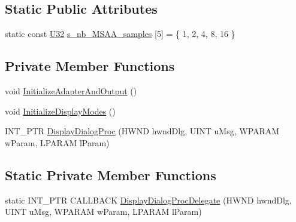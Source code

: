 \subsection*{Static Public Attributes}
\begin{DoxyCompactItemize}
\item 
static const \hyperlink{namespacemage_a41c104c036fba3756a74e19f793eeaa1}{U32} \hyperlink{classmage_1_1_display_configurator_ae4030ce3b63836e4e5c374285cf1f3bc}{s\+\_\+nb\+\_\+\+M\+S\+A\+A\+\_\+samples} \mbox{[}5\mbox{]} = \{ 1, 2, 4, 8, 16 \}
\end{DoxyCompactItemize}
\subsection*{Private Member Functions}
\begin{DoxyCompactItemize}
\item 
void \hyperlink{classmage_1_1_display_configurator_a03fd2c38f6fdb6fbc8ff429a7d0d2a89}{Initialize\+Adapter\+And\+Output} ()
\item 
void \hyperlink{classmage_1_1_display_configurator_a90ecffb8d93768464bb1698531a34db7}{Initialize\+Display\+Modes} ()
\item 
I\+N\+T\+\_\+\+P\+TR \hyperlink{classmage_1_1_display_configurator_a6b43b4d9a5e5beeee435bf93fc9865ef}{Display\+Dialog\+Proc} (H\+W\+ND hwnd\+Dlg, U\+I\+NT u\+Msg, W\+P\+A\+R\+AM w\+Param, L\+P\+A\+R\+AM l\+Param)
\end{DoxyCompactItemize}
\subsection*{Static Private Member Functions}
\begin{DoxyCompactItemize}
\item 
static I\+N\+T\+\_\+\+P\+TR C\+A\+L\+L\+B\+A\+CK \hyperlink{classmage_1_1_display_configurator_a3a15e6afa93904c2aaab6c4f5c501fb4}{Display\+Dialog\+Proc\+Delegate} (H\+W\+ND hwnd\+Dlg, U\+I\+NT u\+Msg, W\+P\+A\+R\+AM w\+Param, L\+P\+A\+R\+AM l\+Param)
\end{DoxyCompactItemize}

